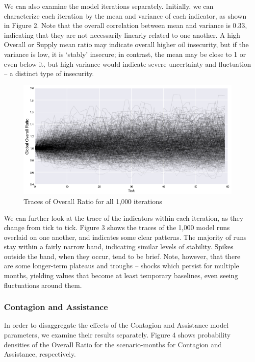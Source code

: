 \documentclass{llncs}
\begin{document}
We can also examine the model iterations separately. Initially, we can characterize each iteration by the mean and variance of each indicator, as shown in Figure 2. Note that the overall correlation between mean and variance is 0.33, indicating that they are not necessarily linearly related to one another. A high Overall or Supply mean ratio may indicate overall higher oil insecurity, but if the variance is low, it is `stably' insecure; in contrast, the mean may be close to 1 or even below it, but high variance would indicate severe uncertainty and fluctuation -- a distinct type of insecurity. 

\begin{figure}[h!]
	\centering
	\includegraphics[width=\textwidth]{../Graphics/AllOverallTraces}
	\caption{Traces of Overall Ratio for all 1,000 iterations}
\end{figure}


We can further look at the trace of the indicators within each iteration, as they change from tick to tick. Figure 3 shows the traces of the 1,000 model runs overlaid on one another, and indicates some clear patterns. The majority of runs stay within a fairly narrow band, indicating similar levels of stability. Spikes outside the band, when they occur, tend to be brief. Note, however, that there are some longer-term plateaus and troughs -- shocks which persist for multiple months, yielding values that become at least temporary baselines, even seeing fluctuations around them.

\subsubsection{Contagion and Assistance}

In order to disaggregate the effects of the Contagion and Assistance model parameters, we examine their results separately. Figure 4 shows probability densities of the Overall Ratio for the scenario-months for Contagion and Assistance, respectively.
\end{document}
